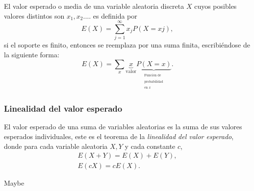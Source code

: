 \documentclass[12pt,letterpaper]{article}
\begin{document}
El valor esperado o media de una variable aleatoria discreta $X$ cuyos posibles valores distintos son $x_1,x_2.\ldots$ es definida por
\begin{equation}
E(X)=\sum_{j=1}^{\infty}x_jP(X=xj),
\end{equation}
si el soporte es finito, entonces se reemplaza por una suma finita, escribiéndose de la siguiente forma:
\begin{equation}
E(X)=\sum_{x}\underbrace{x}_\text{valor}\underbrace{P(X=x)}_{\begin{matrix}^\text{Función de}\\^\text{probabilidad}\\^\text{en $x$}\end{matrix}}.
\end{equation}
\subsubsection {Linealidad del valor esperado}
El valor esperado de una suma de variables aleatorias es la suma de sus valores esperados individuales, este es el teorema de la \emph{linealidad del valor esperado}, donde para cada variable aleatoria $X,Y$ y cada constante $c$,
\begin{equation}
\begin{matrix}
E(X+Y)=E(X)+E(Y),\\
E(cX)=cE(X).
\end{matrix}
\end{equation}






















\newpage
Maybe\cite{blitz19}
\newpage
\printbibliography[heading=bibintoc,title={Fuentes}]
\end{document}
